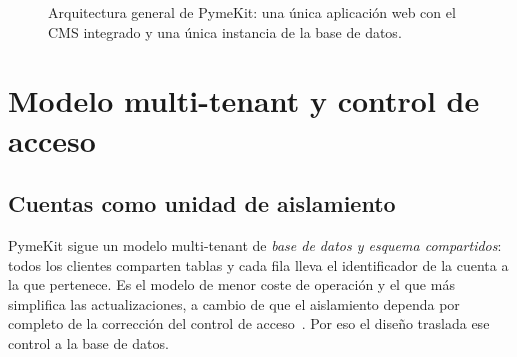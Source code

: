 \begin{figure}[htbp]
{}
  \caption{Arquitectura general de PymeKit: una única aplicación web con el
    CMS integrado y una única instancia de la base de datos.}
  \label{fig:dis-arquitectura}
\end{figure}

\section{Modelo multi-tenant y control de acceso}
\label{sec:dis-multitenant}

\subsection{Cuentas como unidad de aislamiento}
\label{sec:dis-cuentas}

PymeKit sigue un modelo multi-tenant de \emph{base de datos y esquema
compartidos}: todos los clientes comparten tablas y cada fila lleva el
identificador de la cuenta a la que pertenece. Es el modelo de menor coste de
operación y el que más simplifica las actualizaciones, a cambio de que el
aislamiento dependa por completo de la corrección del control de
acceso~\cite{bezemer2010multitenant}. Por eso el diseño traslada ese control a la base de
datos.

